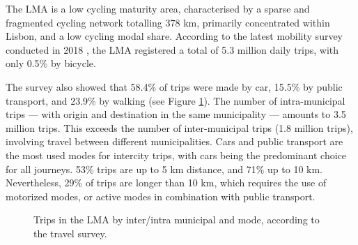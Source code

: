 \documentclass[review, doubleblind, 3p,
authoryear]{elsarticle} %
\begin{document}
The LMA is a low cycling maturity area, characterised by a sparse and
fragmented cycling network totalling 378 km, primarily concentrated
within Lisbon, and a low cycling modal share. According to the latest
mobility survey conducted in 2018 \citep{IMOB}, the LMA registered a
total of 5.3 million daily trips, with only 0.5\% by bicycle.

The survey also showed that 58.4\% of trips were made by car, 15.5\% by
public transport, and 23.9\% by walking (see Figure \ref{fig:mododist}).
The number of intra-municipal trips --- with origin and destination in
the same municipality --- amounts to 3.5 million trips. This exceeds the
number of inter-municipal trips (1.8 million trips), involving travel
between different municipalities. Cars and public transport are the most
used modes for intercity trips, with cars being the predominant choice
for all journeys. 53\% trips are up to 5 km distance, and 71\% up to 10
km. Nevertheless, 29\% of trips are longer than 10 km, which requires
the use of motorized modes, or active modes in combination with public
transport.

\begin{figure}
\caption{\label{mododist}Trips in the LMA by inter/intra municipal and mode, according to the travel survey.}\label{fig:mododist}
\end{figure}
\end{document}
